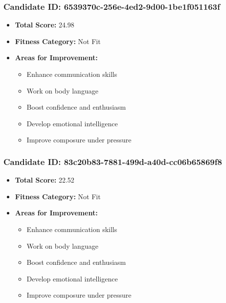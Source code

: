 \documentclass{article}
\begin{document}
\subsubsection{Candidate ID: 6539370c-256e-4ed2-9d00-1be1f051163f}
\begin{itemize}
    \item \textbf{Total Score:} 24.98
    \item \textbf{Fitness Category:} Not Fit
    \item \textbf{Areas for Improvement:}
    \begin{itemize}
        \item Enhance communication skills
        \item Work on body language
        \item Boost confidence and enthusiasm
        \item Develop emotional intelligence
        \item Improve composure under pressure
    \end{itemize}
\end{itemize}

\subsubsection{Candidate ID: 83c20b83-7881-499d-a40d-cc06b65869f8}
\begin{itemize}
    \item \textbf{Total Score:} 22.52
    \item \textbf{Fitness Category:} Not Fit
    \item \textbf{Areas for Improvement:}
    \begin{itemize}
        \item Enhance communication skills
        \item Work on body language
        \item Boost confidence and enthusiasm
        \item Develop emotional intelligence
        \item Improve composure under pressure
    \end{itemize}
\end{itemize}
\end{document}
